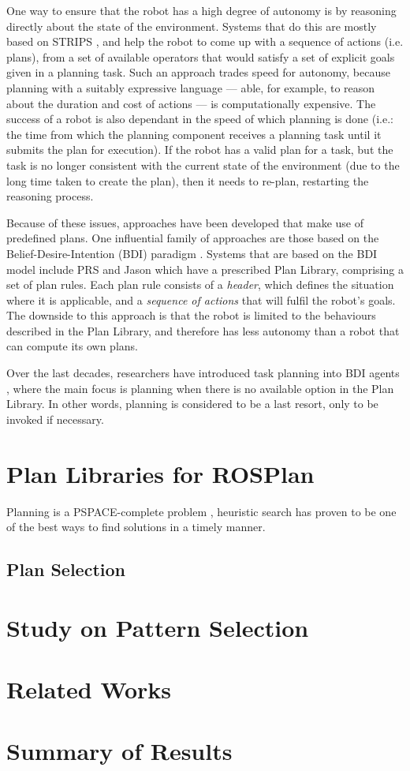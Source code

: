 One way to ensure that the robot has a high degree of autonomy is by reasoning directly about the state of the environment. Systems that do this are mostly based on STRIPS \cite{Fikes-Nilsson:STRIPS}, and help the robot to come up with a sequence of actions (i.e. plans), from a set of available operators that would satisfy a set of explicit goals given in a planning task.
%
Such an approach trades speed for autonomy, because planning with a suitably expressive language --- able, for example, to reason about the duration and cost of actions --- is computationally expensive. The success of a robot is also dependant in the speed of which planning is done (i.e.: the time from which the planning component receives a planning task until it submits the plan for execution). If the robot has a valid plan for a task, but the task is no longer consistent with the current state of the environment (due to the long time taken to create the plan), then it needs to re-plan, restarting the reasoning process. 

Because of these issues, approaches have been developed that make use of predefined plans. One influential family of approaches are those based on the Belief-Desire-Intention (BDI) paradigm \cite{Bratman:BDI}. Systems that are based on the BDI model include PRS \cite{Rao:PRS} and Jason \cite{Bordini:Jason} which have a prescribed Plan Library, comprising a set of plan rules. Each plan rule consists of a \textit{header}, which defines the situation where it is applicable, and a \textit{sequence of actions} that will fulfil the robot's goals. The downside to this approach is that the robot is limited to the behaviours described in the Plan Library, and therefore has less autonomy than a robot that can compute its own plans.

Over the last decades, researchers have introduced task planning into BDI agents \cite{Meneguzzi:PlanningBDI}, where the main focus is planning when there is no available option in the Plan Library. In other words, planning is considered to be a last resort, only to be invoked if necessary.

\section{Plan Libraries for ROSPlan}

Planning is a PSPACE-complete problem \cite{Bylander:Complexity}, heuristic search has proven to be one of the best ways to find solutions in a timely manner. 

\subsection{Plan Selection}

\section*{Study on Pattern Selection}

\section{Related Works}

\section{Summary of Results}